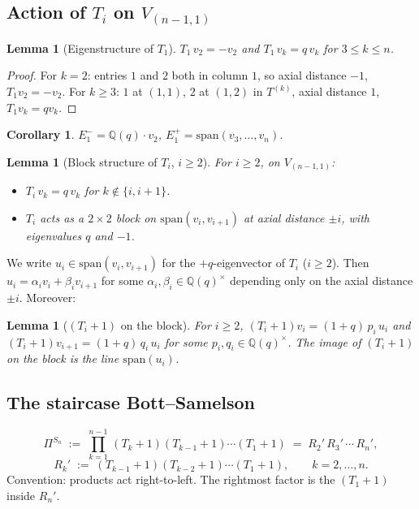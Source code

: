 \documentclass[11pt]{article}
\newtheorem{lemma}[theorem]{Lemma}
\newtheorem{corollary}[theorem]{Corollary}
\theoremstyle{definition}
\begin{document}
\subsection{Action of $T_i$ on $V_{(n-1,1)}$}
\label{ssec:T-action}

\begin{lemma}[Eigenstructure of $T_1$]\label{lem:T1}
$T_1\,v_2 = -v_2$ and $T_1\,v_k = q\,v_k$ for $3\le k\le n$.
\end{lemma}
\begin{proof}
For $k=2$: entries $1$ and $2$ both in column $1$, so axial distance
$-1$, $T_1 v_2=-v_2$. For $k\ge 3$: $1$ at $(1,1)$, $2$ at $(1,2)$ in
$T^{(k)}$, axial distance $1$, $T_1 v_k=q v_k$.
\end{proof}

\begin{corollary}\label{cor:E1}
$E_1^-=\mathbb{Q}(q)\cdot v_2$, $E_1^+=\mathrm{span}(v_3,\ldots,v_n)$.
\end{corollary}

\begin{lemma}[Block structure of $T_i$, $i\geq 2$]\label{lem:Ti}
For $i\ge 2$, on $V_{(n-1,1)}$:
\begin{itemize}[topsep=0.3em,itemsep=0.2em,leftmargin=2em]
\item $T_i\,v_k=q\,v_k$ for $k\notin\{i,i+1\}$.
\item $T_i$ acts as a $2\times 2$ block on
  $\mathrm{span}(v_i,v_{i+1})$ at axial distance $\pm i$, with
  eigenvalues $q$ and $-1$.
\end{itemize}
\end{lemma}

We write $u_i\in\mathrm{span}(v_i,v_{i+1})$ for the $+q$-eigenvector
of $T_i$ ($i\ge 2$). Then $u_i=\alpha_i v_i+\beta_i v_{i+1}$ for some
$\alpha_i,\beta_i\in\mathbb{Q}(q)^\times$ depending only on the axial
distance $\pm i$. Moreover:

\begin{lemma}[$(T_i+1)$ on the block]\label{lem:Tiplus}
For $i\ge 2$, $(T_i+1)v_i=(1+q)\,p_i\,u_i$ and
$(T_i+1)v_{i+1}=(1+q)\,q_i\,u_i$ for some
$p_i,q_i\in\mathbb{Q}(q)^\times$. The image of $(T_i+1)$ on the block is
the line $\mathrm{span}(u_i)$.
\end{lemma}

\subsection{The staircase Bott--Samelson}\label{ssec:pi-def}
\[
   \Pi^{S_n} \;:=\;\prod_{k=1}^{n-1}\,(T_k{+}1)(T_{k-1}{+}1)\cdots(T_1{+}1)
   \;=\; R_2'\,R_3'\,\cdots\,R_n',
\]
\[
   R_k' \;:=\; (T_{k-1}{+}1)(T_{k-2}{+}1)\cdots(T_1{+}1),
   \qquad k=2,\ldots,n.
\]
Convention: products act right-to-left. The rightmost factor is the
$(T_1{+}1)$ inside $R_n'$.
\end{document}

